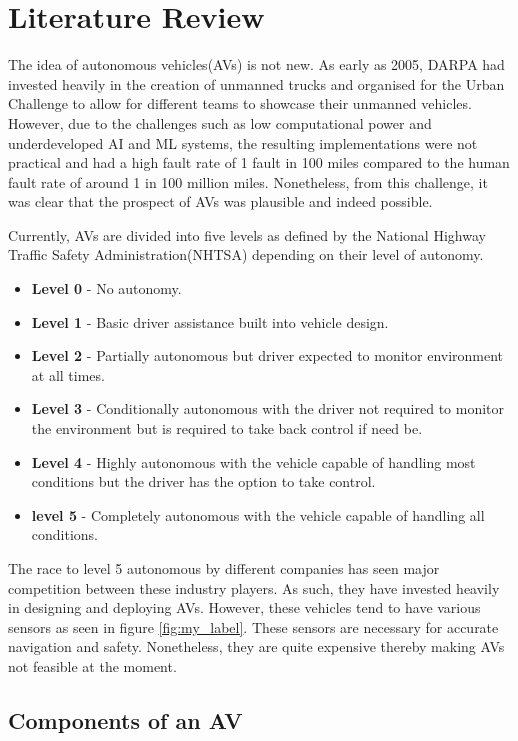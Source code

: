 \let\textcircled=\pgftextcircled


\chapter{Literature Review}
\label{chap:lit_review}

The idea of autonomous vehicles(AVs) is not new. As early as 2005, DARPA had invested heavily in the creation of unmanned trucks and organised for the Urban Challenge \cite{buehler2009darpa} to allow for different teams to showcase their unmanned vehicles. However, due to the challenges such as low computational power and underdeveloped AI and ML systems, the resulting implementations were not practical and had a high fault rate of 1 fault in 100 miles compared to the human fault rate of around 1 in 100 million miles. Nonetheless, from this challenge, it was clear that the prospect of AVs was plausible and indeed possible. 

Currently, AVs are divided into five levels as defined by the National Highway Traffic Safety Administration(NHTSA) depending on their level of autonomy. 
\begin{itemize}
	\item \textbf{Level 0} - No autonomy. 
	\item \textbf{Level 1} - Basic driver assistance built into vehicle design.
	\item \textbf{Level 2} - Partially autonomous but driver expected to monitor environment at all times.
	\item \textbf{Level 3} - Conditionally autonomous with the driver not required to monitor the environment but is required to take back control if need be.
	\item \textbf{Level 4} - Highly autonomous with the vehicle capable of handling most conditions but the driver has the option to take control. 
	\item \textbf{level 5} - Completely autonomous with the vehicle capable of handling all conditions.
\end{itemize}

The race to level 5 autonomous by different companies has seen major competition between these industry players. As such, they have invested heavily in designing and deploying AVs. However, these vehicles tend to have various sensors as seen in figure \ref{fig:my_label}. These sensors are necessary for accurate navigation and safety. Nonetheless, they are quite expensive thereby making AVs not feasible at the moment. 
\section{Components of an AV}

